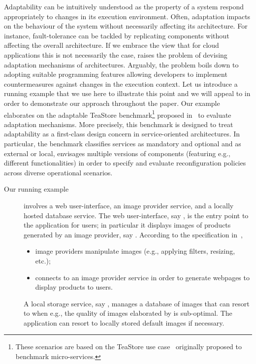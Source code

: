 
Adaptability can be intuitively understood as the property of a system
respond appropriately to changes in its execution environment.
%
Often, adaptation impacts on the behaviour of the system without
necessarily affecting its architecture.
%
For instance, fault-tolerance can be tackled by replicating components
without affecting the overall architecture.
%
If we embrace the view that for cloud applications this is not
necessarily the case, raises the problem of devising adaptation
mechanisms of architectures.
%
Arguably, the problem boils down to adopting suitable programming
features allowing developers to implement countermeasures against changes
in the execution context.
%
Let us introduce a running example that we use here to illustrate this
point and we will appeal to in order to demonstrate our approach throughout the
paper.
%
Our example elaborates on the adaptable
TeaStore benchmark\footnote{%
  These scenarios are based on the TeaStore use
  case~\cite{kistowski:ieee-mascots18} originally proposed to
  benchmark micro-services.} proposed
in~\cite{bliudze:arXiv-2412.16060} to evaluate adaptation mechanisms.
%
More precisely, this benchmark is designed to treat adaptability as a
first-class design concern in service-oriented architectures.
%
In particular, the benchmark classifies services as mandatory and
optional and as external or local, envisages multiple versions of
components (featuring e.g., different functionalities) in order to
specify and evaluate reconfiguration policies across diverse
operational scenarios.

\begin{description}
\item[Our running example] %
  involves a web user-interface, an image provider service, and a
  locally hosted database service.
  The web user-interface, say , is the entry point to the application
  for users; in particular it displays images of products generated by
  an image provider, say .
  According to the specification in~\cite{kistowski:ieee-mascots18},
  \begin{itemize}
  \item image providers manipulate images (e.g., applying filters,
	 resizing, etc.);
  \item {} connects to an image provider service in order to
	 generate webpages to display products to users.
  \end{itemize}
  A local storage service, say , manages a database of images that
   can resort to when e.g., the quality of images elaborated by
   is sub-optimal.
  The application can resort to locally stored default images if
  necessary.
\end{description}

